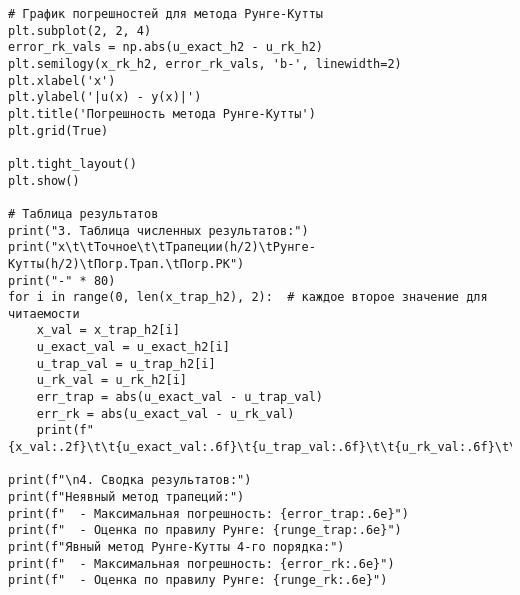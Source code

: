 \documentclass[12pt,a4paper]{article}
\begin{document}
\begin{verbatim}
# График погрешностей для метода Рунге-Кутты
plt.subplot(2, 2, 4)
error_rk_vals = np.abs(u_exact_h2 - u_rk_h2)
plt.semilogy(x_rk_h2, error_rk_vals, 'b-', linewidth=2)
plt.xlabel('x')
plt.ylabel('|u(x) - y(x)|')
plt.title('Погрешность метода Рунге-Кутты')
plt.grid(True)

plt.tight_layout()
plt.show()

# Таблица результатов
print("3. Таблица численных результатов:")
print("x\t\tТочное\t\tТрапеции(h/2)\tРунге-Кутты(h/2)\tПогр.Трап.\tПогр.РК")
print("-" * 80)
for i in range(0, len(x_trap_h2), 2):  # каждое второе значение для читаемости
    x_val = x_trap_h2[i]
    u_exact_val = u_exact_h2[i]
    u_trap_val = u_trap_h2[i]
    u_rk_val = u_rk_h2[i]
    err_trap = abs(u_exact_val - u_trap_val)
    err_rk = abs(u_exact_val - u_rk_val)
    print(f"{x_val:.2f}\t\t{u_exact_val:.6f}\t{u_trap_val:.6f}\t\t{u_rk_val:.6f}\t\t{err_trap:.2e}\t{err_rk:.2e}")

print(f"\n4. Сводка результатов:")
print(f"Неявный метод трапеций:")
print(f"  - Максимальная погрешность: {error_trap:.6e}")
print(f"  - Оценка по правилу Рунге: {runge_trap:.6e}")
print(f"Явный метод Рунге-Кутты 4-го порядка:")
print(f"  - Максимальная погрешность: {error_rk:.6e}")
print(f"  - Оценка по правилу Рунге: {runge_rk:.6e}")

   \end{verbatim}
\end{document}
